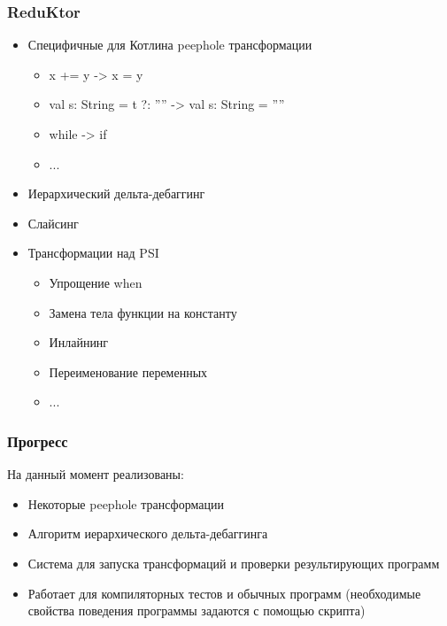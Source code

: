 \begin{frame}
	\frametitle{ReduKtor}
	\begin{itemize}
		\item Специфичные для Котлина peephole трансформации
			\begin{itemize}
				\item x += y -> x = y
				\item val s: String = t ?: '''' -> val s: String = ''''
				\item while -> if
				\item ...
			\end{itemize}
		\item Иерархический дельта-дебаггинг
		\item Слайсинг
		\item Трансформации над PSI
			\begin{itemize}
				\item Упрощение when
				\item Замена тела функции на константу
				\item Инлайнинг
				\item Переименование переменных
				\item ...
			\end{itemize}
	\end{itemize}
\end{frame}


\begin{frame}
	\frametitle{Прогресс}
	На данный момент реализованы:
	\begin{itemize}
		\item Некоторые peephole трансформации
		\item Алгоритм иерархического дельта-дебаггинга
		\item Система для запуска трансформаций и проверки результирующих программ
		\item Работает для компиляторных тестов и обычных программ (необходимые свойства поведения программы задаются с помощью скрипта)
	\end{itemize}
\end{frame}


